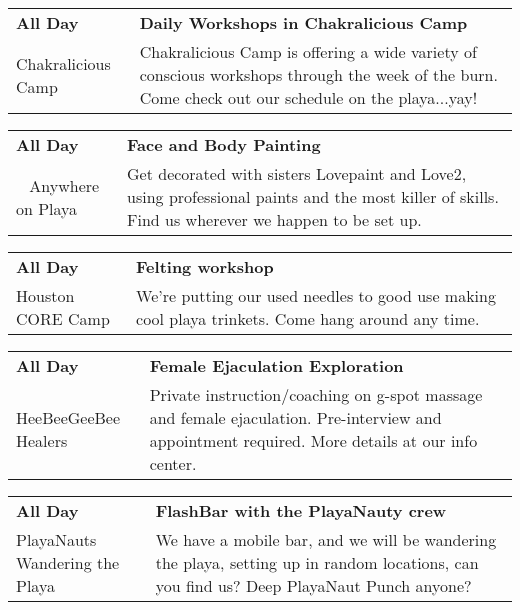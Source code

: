\begin{tabular}{ p{1in} p{2.2in} }
    \textbf{All Day} & \textbf{Daily Workshops in Chakralicious Camp} \\
    Chakralicious Camp \newline  & Chakralicious Camp is offering a wide variety of conscious workshops through the week of the burn. Come check out our schedule on the playa...yay! \\
    \hline 
\end{tabular}
    
\begin{tabular}{ p{1in} p{2.2in} }
    \textbf{All Day} & \textbf{Face and Body Painting} \\
    ~ \newline Anywhere on Playa & Get decorated with sisters Lovepaint and Love2, using professional paints and the most killer of skills. Find us wherever we happen to be set up. \\
    \hline 
\end{tabular}
    
\begin{tabular}{ p{1in} p{2.2in} }
    \textbf{All Day} & \textbf{Felting workshop} \\
    Houston CORE Camp \newline  & We're putting our used needles to good use making cool playa trinkets. Come hang around any time. \\
    \hline 
\end{tabular}
    
\begin{tabular}{ p{1in} p{2.2in} }
    \textbf{All Day} & \textbf{Female Ejaculation Exploration} \\
    HeeBeeGeeBee Healers \newline  & Private instruction/coaching on g-spot massage and female ejaculation.  Pre-interview and appointment required.  More details at our info center. \\
    \hline 
\end{tabular}
    
\begin{tabular}{ p{1in} p{2.2in} }
    \textbf{All Day} & \textbf{FlashBar with the PlayaNauty crew} \\
    PlayaNauts \newline Wandering the Playa & We have a mobile bar, and we will be wandering the playa, setting up in random locations, can you find us?
Deep PlayaNaut Punch anyone? \\
    \hline 
\end{tabular}
    
